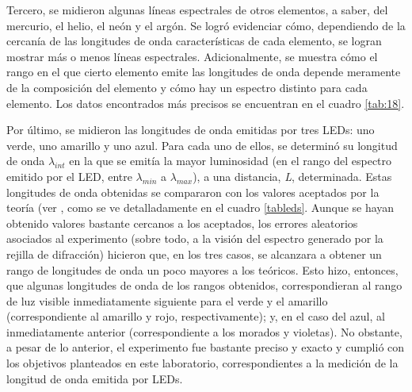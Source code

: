 \documentclass[%
 reprint,
 amsmath,amssymb,
 aps,
]{revtex4-1}
\begin{document}
Tercero, se midieron algunas líneas espectrales de otros elementos, a saber, del mercurio, el helio, el neón y el argón. Se logró evidenciar cómo, dependiendo de la cercanía de las longitudes de onda características de cada elemento, se logran mostrar más o menos líneas espectrales. Adicionalmente, se muestra cómo el rango en el que cierto elemento emite las longitudes de onda depende meramente de la composición del elemento y cómo hay un espectro distinto para cada elemento. Los datos encontrados más precisos se encuentran en el cuadro \ref{tab:18}. 

Por último, se midieron las longitudes de onda emitidas por tres LEDs: uno verde, uno amarillo y uno azul. Para cada uno de ellos, se determinó su longitud de onda $\lambda_{int}$ en la que se emitía la mayor luminosidad (en el rango del espectro emitido por el LED, entre $\lambda_{min}$ a $\lambda_{max}$), a una distancia, \textit{L}, determinada. Estas longitudes de onda obtenidas se compararon con los valores aceptados por la teoría (ver \cite{LEDs_lambda}, como se ve detalladamente en el cuadro \ref{tableds}. Aunque se hayan obtenido valores bastante cercanos a los aceptados, los errores aleatorios asociados al experimento (sobre todo, a la visión del espectro generado por la rejilla de difracción) hicieron que, en los tres casos, se alcanzara a obtener un rango de longitudes de onda un poco mayores a los teóricos. Esto hizo, entonces, que algunas longitudes de onda de los rangos obtenidos, correspondieran al rango de luz visible inmediatamente siguiente para el verde y el amarillo (correspondiente al amarillo y rojo, respectivamente); y, en el caso del azul, al inmediatamente anterior (correspondiente a los morados y violetas). No obstante, a pesar de lo anterior, el experimento fue bastante preciso y exacto y cumplió con los objetivos planteados en este laboratorio, correspondientes a la medición de la longitud de onda emitida por LEDs.




\end{document}
